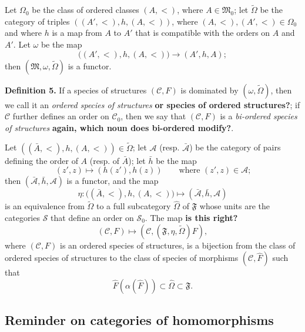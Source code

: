 \documentclass[a4paper,oneside,nobib,nofonts,notitlepage,notoc,nols,fleqn,justified]{tufte-book}
\newenvironment{rmenv}[1]
  {\phantomsection\par\medskip\noindent\textbf{#1.}\rmfamily}
  {\par\medskip}
\newcommand{\unsure}[1]{{\color{purple}\textbf{#1}}}
\newcommand{\CC}{\mathcal{C}}
\renewcommand{\SS}{\mathcal{S}}
\newcommand{\MM}{\mathfrak{M}}
\newcommand{\FF}{\mathfrak{F}}
\renewcommand{\AA}{\mathcal{A}}
\begin{document}
Let $\Omega_0$ be the class of ordered classes $(A,<)$, where $A\in\MM_0$;
let $\widetilde{\Omega}$ be the category of triples $((A',<),h,(A,<))$, where $(A,<),(A',<)\in\Omega_0$ and where $h$ is a map from $A$ to $A'$ that is compatible with the orders on $A$ and $A'$.
Let $\omega$ be the map
\[
  \big((A',<),h,(A,<)\big)
  \longrightarrow (A',h,A);
\]
then $(\MM,\omega,\widetilde{\Omega})$ is a functor.

\begin{rmenv}{Definition 5}
\label{definition:i-5}
  If a species of structures $(\CC,F)$ is dominated by $(\omega,\widetilde{\Omega})$, then we call it an \emph{ordered species of structures} \unsure{or species of ordered structures?};
  if $\CC$ further defines an order on $\CC_0$, then we say that $(\CC,F)$ is a \emph{bi-ordered species of structures} \unsure{again, which noun does bi-ordered modify?}.
\end{rmenv}

Let $((\bar{A},<),h,(A,<))\in\widetilde{\Omega}$;
let $\AA$ (resp. $\bar{\AA}$) be the category of pairs defining the order of $A$ (resp. of $\bar{A}$);
let $\bar{h}$ be the map
\[
  (z',z)
  \longmapsto(h(z'),h(z))
  \qquad\text{where $(z',z)\in\AA$;}
\]
then $(\bar{\AA},\bar{h},\AA)$ is a functor, and the map
\[
  \eta\colon\big((\bar{A},<),h,(A,<)\big)
  \longmapsto(\bar{\AA},\bar{h},\AA)
\]
is an equivalence from $\widetilde{\Omega}$ to a full subcategory $\widehat{\Omega}$ of $\FF$ whose units are the categories $\SS$ that define an order on $\SS_0$.
The map \unsure{is this right?}
\[
  (\CC,F)
  \longmapsto (\CC,(\FF,\eta,\widetilde{\Omega})F),
\]
where $(\CC,F)$ is an ordered species of structures, is a bijection from the class of ordered species of structures to the class of species of morphisms $(\CC,\widehat{F})$ such that
\[
  \widehat{F}(\alpha(\widehat{F}))
  \subset \widehat{\Omega}
  \subset \FF.
\]



\subsection{Reminder on categories of homomorphisms}
\label{section:i.4}
\end{document}
